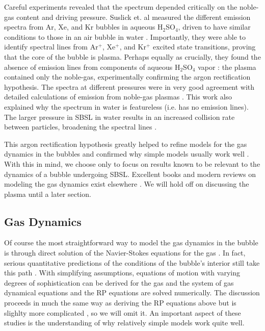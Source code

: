 \documentclass[prb,aps,nofootinbib,superscriptaddress,floatfix]{revtex4-2}
\begin{document}
Careful experiments revealed that the spectrum depended critically on the noble-gas content and driving pressure. Suslick et. al measured the different emission spectra from Ar, Xe, and Kr bubbles in aqueous H$_2$SO$_4$, driven to have similar conditions to those in an air bubble in water \cite{flannigan2005plasma,flannigan2006measurement,suslick2008inside}. Importantly, they were able to identify spectral lines from Ar$^+$, Xe$^+$, and Kr$^+$ excited state transitions, proving that the core of the bubble is plasma. Perhaps equally as crucially, they found the absence of emission lines from components of aqueous H$_2$SO$_4$ vapor \cite{suslick2008inside,flannigan2006measurement,flannigan2006measurement}: the plasma contained only the noble-gas, experimentally confirming the argon rectification hypothesis. The spectra at different pressures were in very good agreement with detailed calculations of emission from noble-gas plasmas \cite{an2009diagnosing,an2008spectral}. This work also explained why the spectrum in water is featureless (i.e. has no emission lines). The larger pressure in SBSL in water results in an increased collision rate between particles, broadening the spectral lines \cite{an2009diagnosing,suslick2008inside,flannigan2005plasma,flannigan2006measurement}.

This argon rectification hypothesis greatly helped to refine models for the gas dynamics in the bubbles and confirmed why simple models usually work well \cite{suslick2008inside,brenner2002single}. With this in mind, we choose only to focus on results known to be relevant to the dynamics of a bubble undergoing SBSL. Excellent books and modern reviews on modeling the gas dynamics exist elsewhere \cite{brenner2002single,yasui2018acoustic,brennen2014cavitation}. We will hold off on discussing the plasma until a later section. 

\subsection{Gas Dynamics}
Of course the most straightforward way to model the gas dynamics in the bubble is through direct solution of the Navier-Stokes equations for the gas \cite{brenner2002single}. In fact, serious quantitative predictions of the conditions of the bubble's interior still take this path \cite{an2006mechanism,an2008spectral,an2009diagnosing,flannigan2005plasma,flannigan2006measurement}. With simplifying assumptions, equations of motion with varying degrees of sophistication can be derived for the gas and the system of gas dynamical equations and the RP equations are solved numerically. The discussion proceeds in much the same way as deriving the RP equations above but is slighlty more complicated \cite{brenner2002single,yasui2018acoustic}, so we will omit it. An important aspect of these studies is the understanding of why relatively simple models work quite well. 
\end{document}
